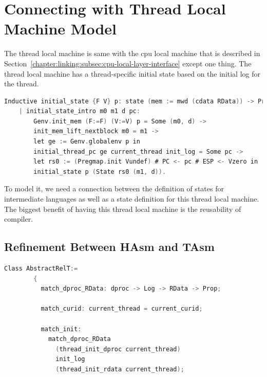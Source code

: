 %
%
%

\section{Connecting with Thread Local Machine Model}
\label{chapter:linking:subsec:connecting-with-thread-local-machine-model}

The thread local machine is same with 
the cpu local machine that is described in Section~\ref{chapter:linking:subsec:cpu-local-layer-interface}
except one thing. 
The thread local machine has a thread-specific initial state 
based on the initial log for the thread. 
\begin{lstlisting}[language=C]
  Inductive initial_state {F V} p: state (mem := mwd (cdata RData)) -> Prop :=
    | initial_state_intro m0 m1 d pc:
        Genv.init_mem (F:=F) (V:=V) p = Some (m0, d) ->
        init_mem_lift_nextblock m0 = m1 ->
        let ge := Genv.globalenv p in
        initial_thread_pc ge current_thread init_log = Some pc ->
        let rs0 := (Pregmap.init Vundef) # PC <- pc # ESP <- Vzero in
        initial_state p (State rs0 (m1, d)).
\end{lstlisting}
To model it, 
we need a connection between the definition of states for intermediate languages 
as well as a state definition for this thread local machine. 
The biggest benefit of having this thread local machine is 
the reusability of compiler. 


\subsection{Refinement Between HAsm and TAsm}

\begin{lstlisting}[language=C]
      Class AbstractRelT:=
        {
          match_dproc_RData: dproc -> Log -> RData -> Prop;

          match_curid: current_thread = current_curid;

          match_init:
            match_dproc_RData
              (thread_init_dproc current_thread)
              init_log
              (thread_init_rdata current_thread);
\end{lstlisting}

